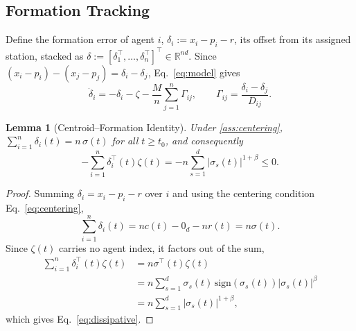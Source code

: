 \documentclass[letterpaper, 10 pt, conference]{ieeeconf}
\newcommand{\R}{\mathbb{R}}
\newtheorem{lemma}{Lemma}
\begin{document}
\subsection{Formation Tracking}
\label{sec:formation}

Define the formation error of agent $i$, $\delta_i:=x_i-p_i-r$, its
offset from its assigned station, stacked as
$\delta:=[\delta_1^\top,\dots,\delta_n^\top]^\top\in\R^{nd}$. Since
$(x_i-p_i)-(x_j-p_j)=\delta_i-\delta_j$, Eq.~\eqref{eq:model} gives
\begin{equation}
\dot\delta_i=-\delta_i-\zeta-\frac{M}{n}\sum_{j=1}^n\Gamma_{ij},\qquad
\Gamma_{ij}=\frac{\delta_i-\delta_j}{D_{ij}}.
\label{eq:error_dyn}
\end{equation}

\begin{lemma}[Centroid--Formation Identity]
\label{lem:identity}
Under \cref{ass:centering},
$\sum_{i=1}^n\delta_i(t)=n\,\sigma(t)$ for all $t\ge t_0$, and
consequently
\begin{equation}
-\sum_{i=1}^n\delta_i^\top(t)\zeta(t)=-n\sum_{s=1}^d|\sigma_s(t)|^{1+\beta}\le0.
\label{eq:dissipative}
\end{equation}
\end{lemma}
\begin{proof}
Summing $\delta_i=x_i-p_i-r$ over $i$ and using the centering
condition Eq.~\eqref{eq:centering},
\[
\sum_{i=1}^n\delta_i(t) = nc(t) - 0_d - nr(t) = n\sigma(t).
\]
Since $\zeta(t)$ carries no agent index, it factors out of the sum,
\begin{align*}
\sum_{i=1}^n\delta_i^\top(t)\zeta(t) &= n\sigma^\top(t)\zeta(t) \\
&= n\sum_{s=1}^d\sigma_s(t)\,\mathrm{sign}(\sigma_s(t))|\sigma_s(t)|^\beta \\
&= n\sum_{s=1}^d|\sigma_s(t)|^{1+\beta},
\end{align*}
which gives Eq.~\eqref{eq:dissipative}.
\end{proof}
\end{document}
